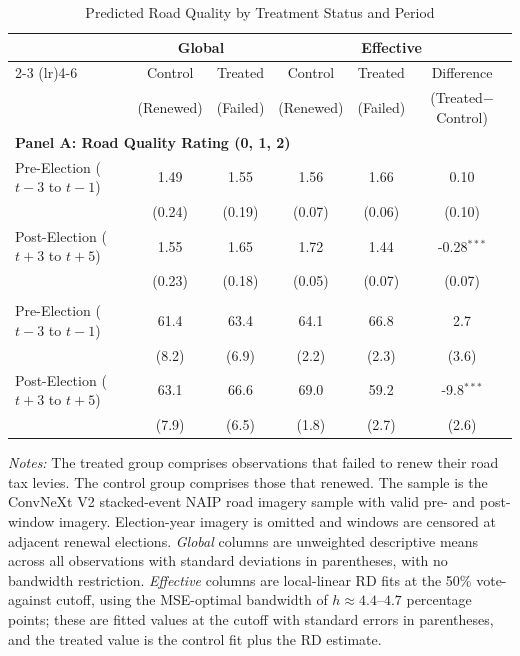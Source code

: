 \begin{table}[H]
    \centering
    \caption{Predicted Road Quality by Treatment Status and Period}
    \label{tab:road_quality_panel}
    \begin{threeparttable}
    \begin{minipage}{\linewidth}
    \centering
    \setlength{\tabcolsep}{5pt}
    \begin{tabular}{lccccc}
        \toprule
        & \multicolumn{2}{c}{\textbf{Global}} & \multicolumn{3}{c}{\textbf{Effective}} \\
        \cmidrule(lr){2-3} \cmidrule(lr){4-6}
        & Control & Treated & Control & Treated & Difference \\
        & (Renewed) & (Failed) & (Renewed) & (Failed) & (Treated$-$Control) \\
        \midrule
        \multicolumn{6}{l}{\textbf{Panel A: Road Quality Rating (0, 1, 2)}} \\
        Pre-Election ($t\!-\!3$ to $t\!-\!1$)  & 1.49 & 1.55 & 1.56 & 1.66 & 0.10 \\
                       & (0.24) & (0.19) & (0.07) & (0.06) & (0.10) \\
        Post-Election ($t\!+\!3$ to $t\!+\!5$) & 1.55 & 1.65 & 1.72 & 1.44 & -0.28$^{***}$ \\
                       & (0.23) & (0.18) & (0.05) & (0.07) & (0.07) \\
        \addlinespace
        \multicolumn{6}{l}{\textbf{Panel B: Road Quality Score (RQS)}} \\
        Pre-Election ($t\!-\!3$ to $t\!-\!1$)  & 61.4 & 63.4 & 64.1 & 66.8 & 2.7 \\
                       & (8.2) & (6.9) & (2.2) & (2.3) & (3.6) \\
        Post-Election ($t\!+\!3$ to $t\!+\!5$) & 63.1 & 66.6 & 69.0 & 59.2 & -9.8$^{***}$ \\
                       & (7.9) & (6.5) & (1.8) & (2.7) & (2.6) \\
        \bottomrule
    \end{tabular}
    \vspace{0.5em}
    \begin{tablenotes}[flushleft]
        \footnotesize
        \item \textit{Notes:} The treated group comprises observations that failed to renew their road tax levies. The control group comprises those that renewed. The sample is the ConvNeXt V2 stacked-event NAIP road imagery sample with valid pre- and post-window imagery. Election-year imagery is omitted and windows are censored at adjacent renewal elections. \textit{Global} columns are unweighted descriptive means across all observations with standard deviations in parentheses, with no bandwidth restriction. \textit{Effective} columns are local-linear RD fits at the 50\% vote-against cutoff, using the MSE-optimal bandwidth of $h\approx4.4$--$4.7$ percentage points; these are fitted values at the cutoff with standard errors in parentheses, and the treated value is the control fit plus the RD estimate. 

\end{tablenotes}
\end{minipage}
\end{threeparttable}
\end{table}

